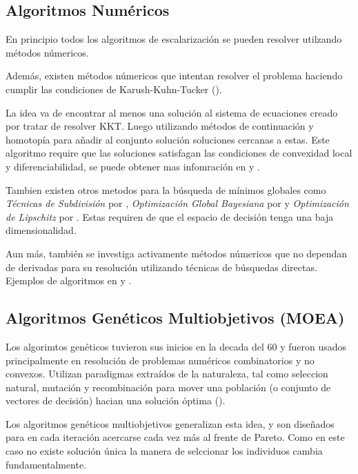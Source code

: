 \subsection{Algoritmos Num\'ericos}

En principio todos los algoritmos de escalarizaci\'on se pueden resolver utilzando m\'etodos n\'umericos.

Adem\'as, existen m\'etodos n\'umericos que intentan resolver el problema haciendo cumplir las condiciones de Karush-Kuhn-Tucker (\cite{kuhn2014nonlinear}).

La idea va de encontrar al menos una soluci\'on al sistema de ecuaciones creado por tratar de resolver KKT. Luego utilizando m\'etodos de continuaci\'on y homotop\'ia para añadir al conjunto soluci\'on soluciones cercanas a estas. Este algoritmo require que las soluciones satisfagan las condiciones de convexidad local y diferenciabilidad, se puede obtener mas infomraci\'on en \cite{hillermeier2001nonlinear} y \cite{schutze_et_al:DagSemProc.04461.16}.

Tambien existen otros metodos para la b\'usqueda de m\'inimos globales como \textit{T\'ecnicas de Subdivisi\'on} por \cite{dellnitz2005covering}, \textit{Optimizaci\'on Global Bayesiana} por \cite{emmerich2016multicriteria} y \textit{Optimizaci\'on de Lipschitz} por \cite{vzilinskas2013worst}. Estas requiren de que el espacio de decisi\'on tenga una baja dimensionalidad.

Aun m\'as, tambi\'en se investiga activamente m\'etodos n\'umericos que no dependan de derivadas para su resoluci\'on utilizando t\'ecnicas de b\'usquedas directas. Ejemplos de algoritmos en \cite{custodio2011direct} y \cite{audet2010mesh}.

\subsection{Algoritmos Gen\'eticos Multiobjetivos (MOEA)}

Los algorimtos gen\'eticos tuvieron sus inicios en la decada del 60 y fueron usados principalmente en resoluci\'on de problemas num\'ericos combinatorios y no convexos. Utilizan paradigmas extra\'idos de la naturaleza, tal como seleccion natural, mutaci\'on y recombinaci\'on para mover una poblaci\'on (o conjunto de vectores de decisi\'on) hacian una soluci\'on \'optima (\cite{back1996evolutionary}).

Los algoritmos gen\'eticos multiobjetivos generalizan esta idea, y son diseñados para en cada iteraci\'on acercarse cada vez m\'as al frente de Pareto. Como en este caso no existe soluci\'on \'unica la manera de selccionar los individuos cambia fundamentalmente.

